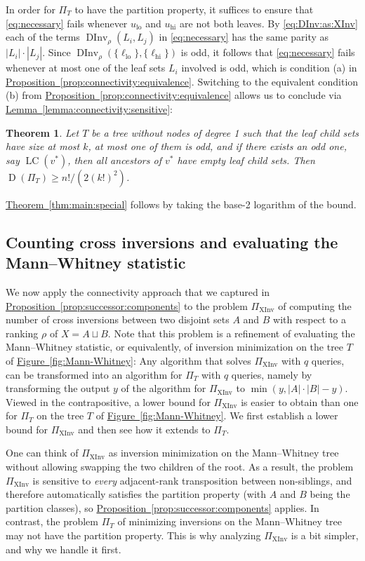 \documentclass[11pt]{article}
\numberwithin{equation}{section}
\newtheorem{theorem}{Theorem}[section]
\theoremstyle{definition}
\theoremstyle{plain}
\newcommand{\expref}[2]{\hyperref[#2]{#1~\ref{#2}}}
\DeclareMathOperator{\leafchildset}{LC}
\newcommand{\ranking}{\rho}
\DeclareMathOperator{\XInv}{XInv}
\DeclareMathOperator{\DInv}{DInv}
\newcommand{\lo}{\mathrm{lo}}
\newcommand{\hi}{\mathrm{hi}}
\DeclareMathOperator{\traces}{D}
\begin{document}
In order for $\Pi_T$ to have the partition property, it suffices to ensure that \eqref{eq:necessary} fails whenever $u_\lo$ and $u_\hi$ are not both leaves. By \eqref{eq:DInv:as:XInv} each of the terms $\DInv_\ranking(L_i,L_j)$ in \eqref{eq:necessary} has the same parity as $|L_i| \cdot |L_j|$. Since $\DInv_\ranking(\{\ell_\lo\},\{\ell_\hi\})$ is odd, it follows that \eqref{eq:necessary} fails whenever at most one of the leaf sets $L_i$ involved is odd, which is condition (a) in \expref{Proposition}{prop:connectivity:equivalence}. Switching to the equivalent condition (b) from \expref{Proposition}{prop:connectivity:equivalence} allows us to conclude via \expref{Lemma}{lemma:connectivity:sensitive}:
\begin{theorem}
Let $T$ be a tree without nodes of degree 1 such that the leaf child sets have size at most $k$, at most one of them is odd, and if there exists an odd one, say $\leafchildset(v^*)$, then all ancestors of $v^*$ have empty leaf child sets. Then $\traces(\Pi_T) \ge n!/(2(k!)^2)$.
\end{theorem}
\expref{Theorem}{thm:main:special} follows by taking the base-2 logarithm of the bound.

\subsection{Counting cross inversions and evaluating the Mann--Whitney statistic}
\label{sec:connectivity:cross-inversions}

We now apply the connectivity approach that we captured in \expref{Proposition}{prop:successor:components} to the problem $\Pi_{\XInv}$ of computing the number of cross inversions between two disjoint sets $A$ and $B$ with respect to a ranking $\ranking$ of $X = A \sqcup B$. Note that this problem is a refinement of evaluating the Mann--Whitney statistic, or equivalently, of inversion minimization on the tree $T$ of \expref{Figure}{fig:Mann-Whitney}: Any algorithm that solves $\Pi_{\XInv}$ with $q$ queries, can be transformed into an algorithm for $\Pi_T$ with $q$ queries, namely by transforming the output $y$ of the algorithm for $\Pi_{\XInv}$ to $\min(y,|A| \cdot |B|-y)$. Viewed in the contrapositive, a lower bound for $\Pi_{\XInv}$ is easier to obtain than one for $\Pi_T$ on the tree $T$ of \expref{Figure}{fig:Mann-Whitney}. We first establish a lower bound for $\Pi_{\XInv}$ and then see how it extends to $\Pi_T$.

One can think of $\Pi_{\XInv}$ as inversion minimization on the Mann--Whitney tree without allowing swapping the two children of the root. As a result, the problem $\Pi_{\XInv}$ is sensitive to \emph{every} adjacent-rank transposition between non-siblings, and therefore automatically satisfies the partition property (with $A$ and $B$ being the partition classes), so \expref{Proposition}{prop:successor:components} applies. In contrast, the problem $\Pi_T$ of minimizing inversions on the Mann--Whitney tree may not have the partition property. This is why analyzing $\Pi_{\XInv}$ is a bit simpler, and why we handle it first.
\end{document}
